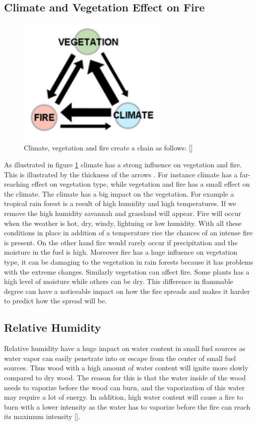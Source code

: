 \subsection{Climate and Vegetation Effect on Fire}
\begin{figure}[here]
  \centering
      \includegraphics[width=0.65\textwidth]{theory/graphics/fire-climate.png}
  \caption{Climate, vegetation and fire create a chain as follows: [] }
  \label{fig:fire-climate}
\end{figure}
As illustrated in figure \ref{fig:fire-climate} climate has a strong influence on vegetation and fire. This is illustrated by the thickness of the arrows . For instance climate has a far-reaching effect on vegetation type, while vegetation and fire has a small effect on the climate. The climate has a big impact on the vegetation. For example a tropical rain forest is a result of high humidity and high temperatures. If we remove the high humidity savannah and grassland will appear. Fire will occur when the weather is hot, dry, windy, lightning or low humidity. With all these conditions in place in addition of a temperature rise the chances of an intense fire is present. On the other hand fire would rarely occur if precipitation and the moisture in the fuel is high.  Moreover fire has a huge influence on vegetation type, it can be damaging to the vegetation in rain forests because it has problems with the extreme changes. Similarly vegetation can affect fire. Some plants has a high level of moisture while others can be dry. This difference in flammable degree can have a noticeable impact on how the fire spreads and makes it harder to predict how the spread will be.
\subsection{Relative Humidity}
Relative humidity have a huge impact on water content in small fuel sources as water vapor can easily penetrate into or escape from the center of small fuel sources. Thus wood with a high amount of water content will ignite more slowly compared to dry wood. The reason for this is that the water inside of the wood needs to vaporize before the wood can burn, and the vaporization of this water may require a lot of energy. In addition, high water content will cause a fire to burn with a lower intensity as the water has to vaporize before the fire can reach its maximum intensity [].

